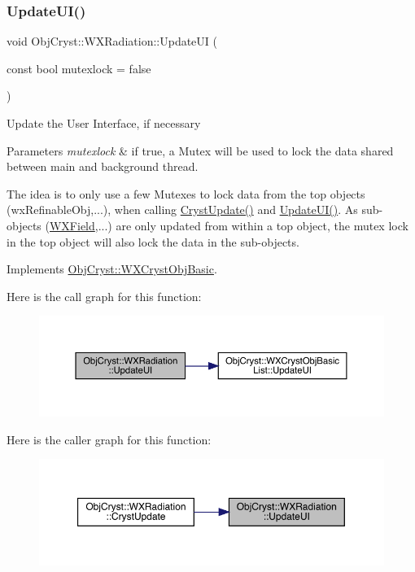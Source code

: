 \subsubsection{\texorpdfstring{UpdateUI()}{UpdateUI()}}
{\footnotesize\ttfamily void Obj\+Cryst\+::\+W\+X\+Radiation\+::\+Update\+UI (\begin{DoxyParamCaption}\item[{const bool}]{mutexlock = {\ttfamily false} }\end{DoxyParamCaption})\hspace{0.3cm}{\ttfamily [virtual]}}

Update the User Interface, if necessary


\begin{DoxyParams}{Parameters}
{\em mutexlock} & if true, a Mutex will be used to lock the data shared between main and background thread.\\
\hline
\end{DoxyParams}
The idea is to only use a few Mutexes to lock data from the top objects (wx\+Refinable\+Obj,...), when calling \mbox{\hyperlink{class_obj_cryst_1_1_w_x_radiation_a4a9fcb2010f116506ffebd7a59f55359}{Cryst\+Update()}} and \mbox{\hyperlink{class_obj_cryst_1_1_w_x_radiation_abb1a51ad74c6072019e28bdc19085ecb}{Update\+U\+I()}}. As sub-\/objects (\mbox{\hyperlink{class_obj_cryst_1_1_w_x_field}{W\+X\+Field}},...) are only updated from within a top object, the mutex lock in the top object will also lock the data in the sub-\/objects. 

Implements \mbox{\hyperlink{class_obj_cryst_1_1_w_x_cryst_obj_basic_a3818940b7031ff7e45cf2178c4a99c90}{Obj\+Cryst\+::\+W\+X\+Cryst\+Obj\+Basic}}.

Here is the call graph for this function\+:
\nopagebreak
\begin{figure}[H]
\begin{center}
\leavevmode
\includegraphics[width=350pt]{class_obj_cryst_1_1_w_x_radiation_abb1a51ad74c6072019e28bdc19085ecb_cgraph}
\end{center}
\end{figure}
Here is the caller graph for this function\+:
\nopagebreak
\begin{figure}[H]
\begin{center}
\leavevmode
\includegraphics[width=350pt]{class_obj_cryst_1_1_w_x_radiation_abb1a51ad74c6072019e28bdc19085ecb_icgraph}
\end{center}
\end{figure}


